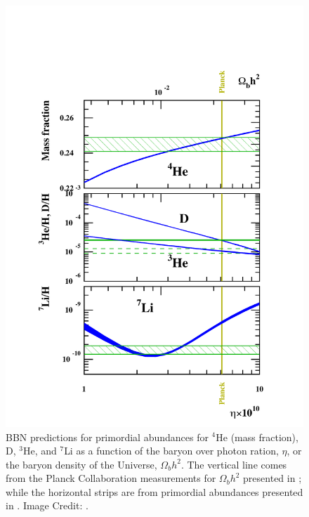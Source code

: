 \begin{figure}
\begin{center}
\includegraphics[width=\textwidth]{Intro-FIGS/heli2015.pdf}
\caption[BBN predictions for primordial abundances. Image Credit: \cite{2017-Abundances-Fig}]{BBN predictions for primordial abundances for $^4$He (mass fraction), D, $^3$He, and $^7$Li as a function of the baryon over photon ration, $\eta$, or the baryon density of the Universe, $\Omega_b h^2$. The vertical line comes from the Planck Collaboration measurements for $\Omega_b h^2$ presented in \cite{planck2013}; while the horizontal strips are from primordial abundances presented in \cite{2015-Abundances-Data}. Image Credit: \cite{2017-Abundances-Fig}.}
\label{fig:BBN}
\end{center}
\end{figure}

